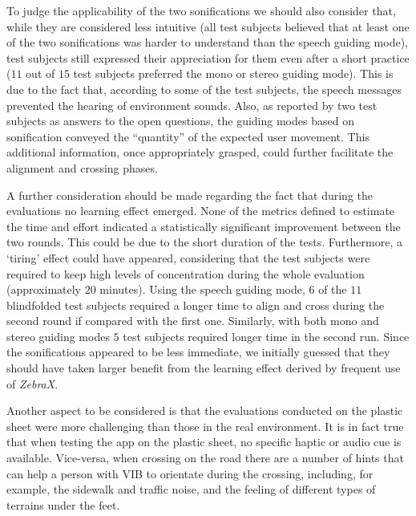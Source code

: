 \documentclass{article}
\newcommand{\zebra}{\emph{ZebraX}}
\begin{document}
To judge the applicability of the two sonifications we should also consider that, while they are considered less intuitive (all test subjects believed that at least one of the two sonifications was harder to understand than the speech guiding mode), test subjects still expressed their appreciation for them even after a short practice ($11$ out of $15$ test subjects preferred the mono or stereo guiding mode).
This is due to the fact that, according to some of the test subjects, the speech messages prevented the hearing of environment sounds. Also, as reported by two test subjects as answers to the open questions, the guiding modes based on sonification conveyed the ``quantity'' of the expected user movement. This additional information, once appropriately grasped, could further facilitate the alignment and crossing phases.

A further consideration should be made regarding the fact that during the evaluations no learning effect emerged. None of the metrics defined to estimate the time and effort indicated a statistically significant improvement between the two rounds. This could be due to the short duration of the tests. Furthermore, a `tiring' effect could have appeared, considering that the test subjects were required to keep high levels of concentration during the whole evaluation (approximately $20$ minutes). Using the speech guiding mode, $6$ of the $11$ blindfolded test subjects required a longer time to align and cross during the second round if compared with the first one.
Similarly, with both mono and stereo guiding modes $5$ test subjects required longer time in the second run. Since the sonifications appeared to be less immediate, we initially guessed that they should have taken larger benefit from the learning effect derived by frequent use of \zebra{}.

Another aspect to be considered is that the evaluations conducted on the plastic sheet were more challenging than those in the real environment. It is in fact true that when testing the app on the plastic sheet, no specific haptic or audio cue is available. Vice-versa, when crossing on the road there are a number of hints that can help a person with VIB to orientate during the crossing, including, for example, the sidewalk and traffic noise, and the feeling of different types of terrains under the feet.
\end{document}
